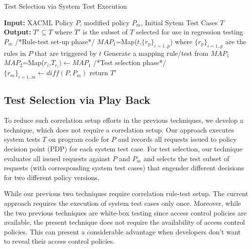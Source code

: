 \begin{algorithmic}
\begin{algorithm}[t]
\caption{Test Selection via System Test Execution}
\STATE \textbf{Input:} XACML Policy $P$, modified policy $P_{m}$, Initial Sytem Test Cases $T$
\STATE \textbf{Output:} $T' \subseteq T$ where $T'$ is the subset of $T$ selected for use in regression testing $P_{m}$
\STATE /*Rule-test set-up phase*/
\STATE $MAP_{1}$=Map($t$,$\{r_{p}\}_{i=1..p}$) where $\{r_{p}\}_{i=1..p}$ are the rules in $P$ that are triggered by $t$
\ENDFOR
\STATE Generate a mapping rule/test from $MAP_{1}$
\STATE $MAP_{2}$=Map($r_{i}$,$T_{r_{i}}) \leftarrow MAP_{1}$
\STATE /*Test selection phase*/
\STATE $\{r_{m}\}_{i=1..m} \leftarrow diff(P,P_{m})$
\ENDFOR
\STATE return $T'$
\end{algorithm}
\end{algorithmic}

\subsection{Test Selection via Play Back}
To reduce such correlation setup efforts in the previous techniques, we develop
a technique, which does not require a correlation setup. 
Our approach executes system tests $T$ on program code for $P$ and records all requests issued to policy decision point (PDP) for each 
system test case. For test selection, our technique evaluates all issued requests against $P$ and $P_m$ and selects the test subset of
 requests (with corresponding system test cases) that engender different decisions for two different policy versions.

While our previous two techniques require correlation rule-test setup. 
The current approach requires the execution of system test cases only once.
Moreover, while the two previous techniques are white-box testing since access control policies are available, the present technique 
does not require the availability of access control policies. This can present a considerable advantage when developers don't want 
to reveal their access control policies.

